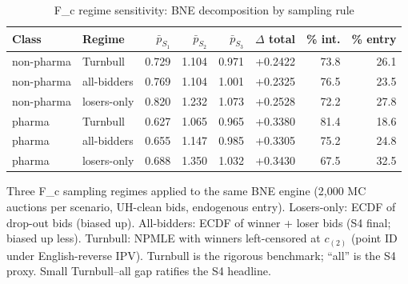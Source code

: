 \begin{table}[htbp]
\centering
\begin{threeparttable}
\caption{F\_c regime sensitivity: BNE decomposition by sampling rule}
\label{tab:v3_sensitivity_fc}
\small
\begin{tabular}{llrrrrrr}
\toprule
Class & Regime & $\bar p_{S_1}$ & $\bar p_{S_2}$ & $\bar p_{S_3}$ & $\Delta$ total & \% int. & \% entry \\
\midrule
non-pharma & Turnbull & 0.729 & 1.104 & 0.971 & +0.2422 & 73.8 & 26.1 \\
non-pharma & all-bidders & 0.769 & 1.104 & 1.001 & +0.2325 & 76.5 & 23.5 \\
non-pharma & losers-only & 0.820 & 1.232 & 1.073 & +0.2528 & 72.2 & 27.8 \\
pharma & Turnbull & 0.627 & 1.065 & 0.965 & +0.3380 & 81.4 & 18.6 \\
pharma & all-bidders & 0.655 & 1.147 & 0.985 & +0.3305 & 75.2 & 24.8 \\
pharma & losers-only & 0.688 & 1.350 & 1.032 & +0.3430 & 67.5 & 32.5 \\
\bottomrule
\end{tabular}
\begin{tablenotes}\footnotesize
\item Three F\_c sampling regimes applied to the same BNE engine
(2{,}000 MC auctions per scenario, UH-clean bids, endogenous entry).
Losers-only: ECDF of drop-out bids (biased up). All-bidders:
ECDF of winner + loser bids (S4 final; biased up less). Turnbull:
NPMLE with winners left-censored at $c_{(2)}$ (point ID under
English-reverse IPV). Turnbull is the rigorous benchmark; ``all''
is the S4 proxy. Small Turnbull--all gap ratifies the S4 headline.
\end{tablenotes}
\end{threeparttable}
\end{table}
